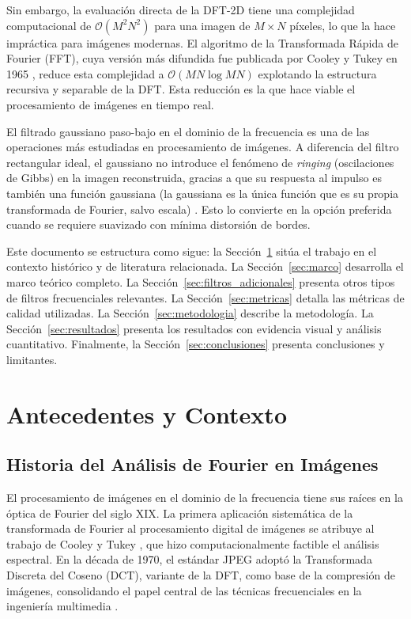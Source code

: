 \documentclass[conference]{IEEEtran}
\begin{document}
Sin embargo, la evaluación directa de la DFT-2D tiene una complejidad
computacional de $\mathcal{O}(M^2N^2)$ para una imagen de $M\times N$
píxeles, lo que la hace impráctica para imágenes modernas. El algoritmo de
la Transformada Rápida de Fourier (FFT), cuya versión más difundida fue
publicada por Cooley y Tukey en 1965 \cite{cooley1967}, reduce esta
complejidad a $\mathcal{O}(MN\log MN)$ explotando la estructura recursiva
y separable de la DFT. Esta reducción es la que hace viable el procesamiento
de imágenes en tiempo real.

El filtrado gaussiano paso-bajo en el dominio de la frecuencia es una
de las operaciones más estudiadas en procesamiento de imágenes. A diferencia
del filtro rectangular ideal, el gaussiano no introduce el fenómeno de
\textit{ringing} (oscilaciones de Gibbs) en la imagen reconstruida, gracias
a que su respuesta al impulso es también una función gaussiana (la gaussiana
es la única función que es su propia transformada de Fourier, salvo escala)
\cite{gonzalez2018}. Esto lo convierte en la opción preferida cuando se
requiere suavizado con mínima distorsión de bordes.

Este documento se estructura como sigue: la Sección~\ref{sec:antecedentes}
sitúa el trabajo en el contexto histórico y de literatura relacionada. La
Sección~\ref{sec:marco} desarrolla el marco teórico completo. La
Sección~\ref{sec:filtros_adicionales} presenta otros tipos de filtros
frecuenciales relevantes. La Sección~\ref{sec:metricas} detalla las métricas
de calidad utilizadas. La Sección~\ref{sec:metodologia} describe la
metodología. La Sección~\ref{sec:resultados} presenta los resultados con
evidencia visual y análisis cuantitativo. Finalmente,
la Sección~\ref{sec:conclusiones} presenta conclusiones y limitantes.

\section{Antecedentes y Contexto}
\label{sec:antecedentes}

\subsection{Historia del Análisis de Fourier en Imágenes}

El procesamiento de imágenes en el dominio de la frecuencia tiene sus raíces
en la óptica de Fourier del siglo XIX. La primera aplicación sistemática de
la transformada de Fourier al procesamiento digital de imágenes se atribuye
al trabajo de Cooley y Tukey \cite{cooley1967}, que hizo computacionalmente
factible el análisis espectral. En la década de 1970, el estándar JPEG adoptó
la Transformada Discreta del Coseno (DCT), variante de la DFT, como base de
la compresión de imágenes, consolidando el papel central de las técnicas
frecuenciales en la ingeniería multimedia \cite{gonzalez2018}.
\end{document}
